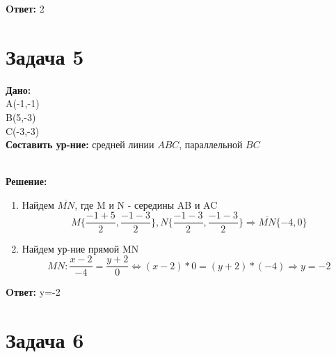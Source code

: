 \documentclass{article}
\begin{document}
\textbf{Oтвет: }2 

\section*{Задача 5}

\begin{minipage}[t]{0.45\textwidth}
   
\textbf{Дано:} \\ 
A(-1,-1)\\ 
B(5,-3)\\
C(-3,-3)\\
\textbf{Составить ур-ние: } средней линии $ABC$, параллельной $BC$
\end{minipage}
\begin{minipage}[t]{0.45\textwidth}
	\vspace{-\baselineskip} %

\begin{center}
\end{center}
\end{minipage}
\\
\textbf{Решение:}
\begin{enumerate}
  \item Найдем $\overline{MN}$, где M и N - середины AB и AC \\ 
    \[
      M\{\frac{-1+5}{2}, \frac{-1-3}{2}\}, N\{\frac{-1-3}{2} ,\frac{-1-3}{2}\} \Rightarrow \overline{MN}\{-4,0\}
    \]
  \item Найдем ур-ние прямой MN\\
    \[
      MN: 
      \displaystyle\frac{x-2}{-4} = \displaystyle\frac{y+2}{0} \Leftrightarrow 
      (x-2)*0 = (y+2)*(-4) \Rightarrow y=-2 
    \]
\end{enumerate}

\textbf{Oтвет: } y=-2


\section*{Задача 6}
\end{document}
